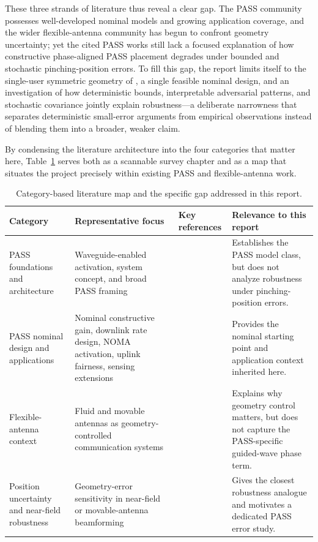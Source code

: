 These three strands of literature thus reveal a clear gap. The PASS community possesses well-developed nominal models and growing application coverage, and the wider flexible-antenna community has begun to confront geometry uncertainty; yet the cited PASS works still lack a focused explanation of how constructive phase-aligned PASS placement degrades under bounded and stochastic pinching-position errors. To fill this gap, the report limits itself to the single-user symmetric geometry of \cite{ouyang2025array}, a single feasible nominal design, and an investigation of how deterministic bounds, interpretable adversarial patterns, and stochastic covariance jointly explain robustness—a deliberate narrowness that separates deterministic small-error arguments from empirical observations instead of blending them into a broader, weaker claim.

By condensing the literature architecture into the four categories that matter here, Table~\ref{tab:literature_map} serves both as a scannable survey chapter and as a map that situates the project precisely within existing PASS and flexible-antenna work.

\begin{table}[H]
\centering
\small
\caption{Category-based literature map and the specific gap addressed in this report.}
\label{tab:literature_map}
\begin{tabularx}{\textwidth}{>{\raggedright\arraybackslash}p{} >{\raggedright\arraybackslash}p{} >{\raggedright\arraybackslash}p{} >{\raggedright\arraybackslash}X}
\toprule
Category & Representative focus & Key references & Relevance to this report \\
\midrule
PASS foundations and architecture & Waveguide-enabled activation, system concept, and broad PASS framing & \cite{fukuda2022pinching,ding2025perspective,liu2026tutorial} & Establishes the PASS model class, but does not analyze robustness under pinching-position errors. \\
PASS nominal design and applications & Nominal constructive gain, downlink rate design, NOMA activation, uplink fairness, sensing extensions & \cite{ouyang2025array,xu2025downlink,wang2025noma,tegos2025uplink,ding2025isac} & Provides the nominal starting point and application context inherited here. \\
Flexible-antenna context & Fluid and movable antennas as geometry-controlled communication systems & \cite{wong2021fluid,zhu2024movable,new2025tutorial,zhu2025tutorialma} & Explains why geometry control matters, but does not capture the PASS-specific guided-wave phase term. \\
Position uncertainty and near-field robustness & Geometry-error sensitivity in near-field or movable-antenna beamforming & \cite{ouyang2024primer,su2025positionerror,yang2026nearfield} & Gives the closest robustness analogue and motivates a dedicated PASS error study. \\
\bottomrule
\end{tabularx}
\end{table}

